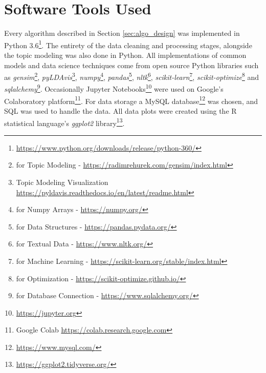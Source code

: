 \section{Software Tools Used} \label{sec:tools}
    Every algorithm described in Section \ref{sec:algo_design} was implemented in Python 3.6\footnote{\url{https://www.python.org/downloads/release/python-360/}}. The entirety of the data cleaning and processing stages, alongside the topic modeling was also done in Python. All implementations of common models and data science techniques come from open source Python libraries such as \emph{gensim}\footnote{for Topic Modeling - \url{https://radimrehurek.com/gensim/index.html}}, \emph{pyLDAvis}\footnote{Topic Modeling Visualization \url{https://pyldavis.readthedocs.io/en/latest/readme.html}}, \emph{numpy}\footnote{for Numpy Arrays - \url{https://numpy.org/}}, \emph{pandas}\footnote{for Data Structures - \url{https://pandas.pydata.org/}}, \emph{nltk}\footnote{for Textual Data - \url{https://www.nltk.org/}}, \emph{scikit-learn}\footnote{for Machine Learning - \url{https://scikit-learn.org/stable/index.html}}, \emph{scikit-optimize}\footnote{for Optimization - \url{https://scikit-optimize.github.io/}} and \emph{sqlalchemy}\footnote{for Database Connection - \url{https://www.sqlalchemy.org/}}. Occasionally Jupyter Notebooks\footnote{\url{https://jupyter.org}} were used on Google's Colaboratory \cite{bisong2019google} platform\footnote{Google Colab \url{https://colab.research.google.com}}. For data storage a MySQL database\footnote{\url{https://www.mysql.com/}} was chosen, and SQL was used to handle the data. All data plots were created using the R \cite{team2013r} statistical language's \emph{ggplot2} \cite{wickham2016ggplot2} library\footnote{\url{https://ggplot2.tidyverse.org/}}.


    
